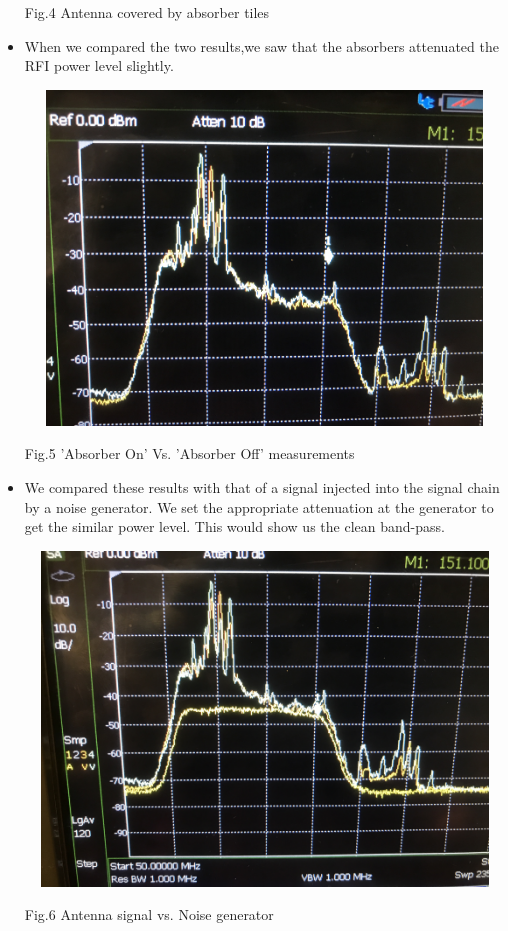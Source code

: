 \documentclass[11pt]{article}
\begin{document}
\begin{itemize}
\begin{center}
			Fig.4 Antenna covered by absorber tiles
		\end{center}
	
		
		\item When we compared the two results,we saw that the absorbers attenuated the RFI power level slightly.
	
	\begin{center}
		\includegraphics[width=5in,height=3.5in]{On_Off.JPG}
		
		Fig.5 'Absorber On' Vs. 'Absorber Off' measurements
	\end{center}
 	
 		\item We compared these results with that of a signal injected into the signal chain by a noise generator. We set the appropriate attenuation at the generator to get the similar power level. This would show us the clean band-pass.
 		
 		\begin{center}
 			\includegraphics[width=5in,height=3.5in]{combined.JPG}
 			
 			Fig.6 Antenna signal vs. Noise generator
 		\end{center}
 	\end{itemize}
 
\end{document}
